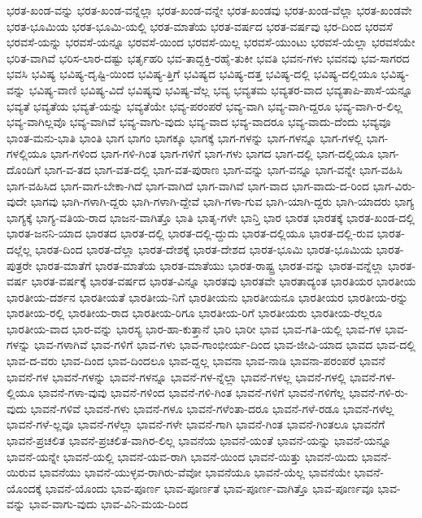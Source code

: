 {ಭರತ-ಖಂಡ-ವನ್ನು
ಭರತ-ಖಂಡ-ವನ್ನೆಲ್ಲಾ
ಭರತ-ಖಂಡ-ವನ್ನೇ
ಭರತ-ಖಂಡವು
ಭರತ-ಖಂಡ-ವೆಲ್ಲಾ
ಭರತ-ಖಂಡವೇ
ಭರತ-ಭೂಮಿಯ
ಭರತ-ಭೂಮಿ-ಯಲ್ಲಿ
ಭರತ-ಮಾತೆಯ
ಭರತ-ವರ್ಷದ
ಭರತ-ವರ್ಷವು
ಭರ-ದಿಂದ
ಭರವಸೆ
ಭರವಸೆ-ಯನ್ನು
ಭರವಸೆ-ಯನ್ನೂ
ಭರವಸೆ-ಯಿಂದ
ಭರವಸೆ-ಯಿಲ್ಲ
ಭರವಸೆ-ಯುಂಟು
ಭರವಸೆ-ಯೆಲ್ಲಾ
ಭರವಸೆಯೇ
ಭರಿತ-ವಾಗಿವೆ
ಭರಿಸ-ಲಾರ-ದಷ್ಟು
ಭರ್ತೃಹರಿ
ಭವ-ತಾದ್ಭಕ್ತಿ-ರಹೈ-ತುಕೀ
ಭವತಿ
ಭವನ-ಗಳು
ಭವನವು
ಭವ-ಸಾಗರದ
ಭವಸಿ
ಭವಿಷ್ಯ
ಭವಿಷ್ಯ-ದೃಷ್ಟಿ-ಯಿಂದ
ಭವಿಷ್ಯ-ತ್ತಿಗೆ
ಭವಿಷ್ಯದ
ಭವಿಷ್ಯ-ದತ್ತ
ಭವಿಷ್ಯ-ದಲ್ಲಿ
ಭವಿಷ್ಯ-ದಲ್ಲಿಯೂ
ಭವಿಷ್ಯ-ವನ್ನು
ಭವಿಷ್ಯ-ವಾಣಿ
ಭವಿಷ್ಯ-ವಿದೆ
ಭವಿಷ್ಯವು
ಭವಿಷ್ಯ-ವೆಲ್ಲ
ಭವ್ಯ
ಭವ್ಯತಮ
ಭವ್ಯತರ-ವಾದ
ಭವ್ಯತಾಪಿ-ಪಾಸೆ-ಯನ್ನೂ
ಭವ್ಯತೆ
ಭವ್ಯತೆಯ
ಭವ್ಯತೆ-ಯನ್ನು
ಭವ್ಯತೆಯೇ
ಭವ್ಯ-ಪರಂಪರೆ
ಭವ್ಯ-ವಾಗಿ
ಭವ್ಯ-ವಾಗಿ-ದ್ದರೂ
ಭವ್ಯ-ವಾಗಿ-ರ-ಲಿಲ್ಲ
ಭವ್ಯ-ವಾಗಿಲ್ಲವೊ
ಭವ್ಯ-ವಾಗಿವೆ
ಭವ್ಯ-ವಾಗು-ವುದು
ಭವ್ಯ-ವಾದ
ಭವ್ಯ-ವಾದರೂ
ಭವ್ಯ-ವಾದು-ದೆಂದು
ಭವ್ಯವೂ
ಭಾಂತ-ಮನು-ಭಾತಿ
ಭಾಂತಿ
ಭಾಗ
ಭಾಗಂ
ಭಾಗಕ್ಕೂ
ಭಾಗಕ್ಕೆ
ಭಾಗ-ಗಳನ್ನು
ಭಾಗ-ಗಳನ್ನೂ
ಭಾಗ-ಗಳಲ್ಲಿ
ಭಾಗ-ಗಳಲ್ಲಿಯೂ
ಭಾಗ-ಗಳಿಂದ
ಭಾಗ-ಗಳಿ-ಗಿಂತ
ಭಾಗ-ಗಳಿಗೆ
ಭಾಗ-ಗಳು
ಭಾಗದ
ಭಾಗ-ದಲ್ಲಿ
ಭಾಗ-ದಲ್ಲಿಯೂ
ಭಾಗ-ದೊಂದಿಗೆ
ಭಾಗ-ವ-ತದ
ಭಾಗ-ವತ-ದಲ್ಲಿ
ಭಾಗ-ವತ-ಪುರಾಣ
ಭಾಗ-ವನ್ನು
ಭಾಗ-ವನ್ನೂ
ಭಾಗ-ವನ್ನೇ
ಭಾಗ-ವಹಿಸಿ
ಭಾಗ-ವಹಿಸಿದ
ಭಾಗ-ವಾಗ-ಬೇಕಾ-ಗಿದೆ
ಭಾಗ-ವಾಗಿದೆ
ಭಾಗ-ವಾಗಿವೆ
ಭಾಗ-ವಾದ
ಭಾಗ-ವಾದು-ದ-ರಿಂದ
ಭಾಗ-ವಿರು-ವುದೇ
ಭಾಗವು
ಭಾಗಿ-ಗಳಾಗಿ-ದ್ದರು
ಭಾಗಿ-ಗಳಾಗಿ-ದ್ದೇವೆ
ಭಾಗಿ-ಗಳಾ-ಗುವ
ಭಾಗಿ-ಯಾಗಿ-ದ್ದರು
ಭಾಗಿ-ಯಾದರು
ಭಾಗ್ಯ
ಭಾಗ್ಯಕ್ಕೆ
ಭಾಗ್ಯ-ವತಿಯ-ರಾದ
ಭಾಜನ-ವಾಗಿತ್ತೊ
ಭಾತಿ
ಭಾತೃ-ಗಳೇ
ಭಾನ್ತಿ
ಭಾರ
ಭಾರತ
ಭಾರತಕ್ಕೆ
ಭಾರತ-ಖಂಡ-ದಲ್ಲಿ
ಭಾರತ-ಜನನಿ-ಯಾದ
ಭಾರತದ
ಭಾರತ-ದಲ್ಲಿ
ಭಾರತ-ದಲ್ಲಿ-ದ್ದುದು
ಭಾರತ-ದಲ್ಲಿಯೂ
ಭಾರತ-ದಲ್ಲಿ-ರುವ
ಭಾರತ-ದಲ್ಲೆಲ್ಲ
ಭಾರತ-ದಿಂದ
ಭಾರತ-ದೆಲ್ಲಾ
ಭಾರತ-ದೇಶಕ್ಕೆ
ಭಾರತ-ದೇಶದ
ಭಾರತ-ಭೂಮಿ
ಭಾರತ-ಭೂಮಿಯ
ಭಾರತ-ಪುತ್ರರೇ
ಭಾರತ-ಮಾತೆಗೆ
ಭಾರತ-ಮಾತೆಯ
ಭಾರತ-ಮಾತೆಯು
ಭಾರತ-ರಾಷ್ಟ್ರ
ಭಾರತ-ವನ್ನು
ಭಾರತ-ವನ್ನೆಲ್ಲಾ
ಭಾರತ-ವರ್ಷ
ಭಾರತ-ವರ್ಷಕ್ಕೆ
ಭಾರತ-ವರ್ಷದ
ಭಾರತ-ವಿನ್ನೂ
ಭಾರತವು
ಭಾರತವೇ
ಭಾರತಾದ್ಯಂತ
ಭಾರತಿಯರ
ಭಾರತೀಯ
ಭಾರತೀಯ-ದರ್ಶನ
ಭಾರತೀಯತೆ
ಭಾರತೀಯ-ನಿಗೆ
ಭಾರತೀಯನು
ಭಾರತೀಯನೂ
ಭಾರತೀಯರ
ಭಾರತೀಯ-ರನ್ನು
ಭಾರತೀಯ-ರಲ್ಲಿ
ಭಾರತೀಯ-ರಾದ
ಭಾರತೀಯ-ರಿಗೂ
ಭಾರತೀಯ-ರಿಗೆ
ಭಾರತೀಯರು
ಭಾರತೀಯ-ರೆಲ್ಲರೂ
ಭಾರತೀಯ-ವಾದ
ಭಾರ-ವನ್ನು
ಭಾರಸ್ಯ
ಭಾರ-ಹಾ-ಕುತ್ತಾನೆ
ಭಾರಿ
ಭಾರೀ
ಭಾವ
ಭಾವ-ಗತಿ-ಯಲ್ಲಿ
ಭಾವ-ಗಳ
ಭಾವ-ಗಳನ್ನು
ಭಾವ-ಗಳಾಗಿವೆ
ಭಾವ-ಗಳಿಗೆ
ಭಾವ-ಗಳು
ಭಾವ-ಗಾಂಭೀರ್ಯ-ದಿಂದ
ಭಾವ-ಜೀವಿ-ಯಾದ
ಭಾವದ
ಭಾವ-ದಲ್ಲಿ
ಭಾವ-ದ-ವರು
ಭಾವ-ದಿಂದ
ಭಾವ-ದಿಂದಲೂ
ಭಾವ-ದ್ದಲ್ಲ
ಭಾವನಾ
ಭಾವ-ನಾಡಿ
ಭಾವನಾ-ಪರಂಪರೆ
ಭಾವನೆ
ಭಾವನೆ-ಗಳ
ಭಾವನೆ-ಗಳನ್ನು
ಭಾವನೆ-ಗಳನ್ನೂ
ಭಾವನೆ-ಗಳ-ನ್ನೆಲ್ಲಾ
ಭಾವನೆ-ಗಳಲ್ಲ
ಭಾವನೆ-ಗಳಲ್ಲಿ
ಭಾವನೆ-ಗಳ-ಲ್ಲಿಯೂ
ಭಾವನೆ-ಗಳಾ-ವುವು
ಭಾವನೆ-ಗಳಿಂದ
ಭಾವನೆ-ಗಳಿ-ಗಿಂತ
ಭಾವನೆ-ಗಳಿಗೆ
ಭಾವನೆ-ಗಳಿಗೆಲ್ಲ
ಭಾವನೆ-ಗಳಿ-ರು-ವುದು
ಭಾವನೆ-ಗಳಿವೆ
ಭಾವನೆ-ಗಳು
ಭಾವನೆ-ಗಳೂ
ಭಾವನೆ-ಗಳೆಂತಾ-ದರೂ
ಭಾವನೆ-ಗಳೆ-ರಡೂ
ಭಾವನೆ-ಗಳೆಲ್ಲ
ಭಾವನೆ-ಗಳೆ-ಲ್ಲವೂ
ಭಾವನೆ-ಗಳೆಲ್ಲಾ
ಭಾವನೆ-ಗಳೇ
ಭಾವನೆ-ಗಾಗಿ
ಭಾವನೆ-ಗಿಂತ
ಭಾವನೆ-ಗಿಂತಲೂ
ಭಾವನೆಗೆ
ಭಾವನೆ-ಪ್ರಚಲಿತ
ಭಾವನೆ-ಪ್ರಚಲಿತ-ವಾಗಿರ-ಲಿಲ್ಲ
ಭಾವನೆಯ
ಭಾವನೆ-ಯಂತೆ
ಭಾವನೆ-ಯನ್ನು
ಭಾವನೆ-ಯನ್ನೂ
ಭಾವನೆ-ಯನ್ನೇ
ಭಾವನೆ-ಯಲ್ಲಿ
ಭಾವನೆ-ಯವ-ರಾಗಿ
ಭಾವನೆ-ಯಿಂದ
ಭಾವನೆ-ಯಿತ್ತು
ಭಾವನೆ-ಯಿದು
ಭಾವನೆ-ಯಿರುವ
ಭಾವನೆಯು
ಭಾವನೆ-ಯುಳ್ಳವ-ರಾಗಿರು-ವೆವೋ
ಭಾವನೆಯೂ
ಭಾವನೆ-ಯೆಲ್ಲ
ಭಾವನೆಯೇ
ಭಾವನೆ-ಯೊಂದಕ್ಕೆ
ಭಾವನೆ-ಯೊಂದು
ಭಾವ-ಪೂರ್ಣ
ಭಾವ-ಪೂರ್ಣತೆ
ಭಾವ-ಪೂರ್ಣ-ವಾಗಿತ್ತೊ
ಭಾವ-ಪೂರ್ಣವೂ
ಭಾವ-ವನ್ನು
ಭಾವ-ವಾಗು-ವುದು
ಭಾವ-ವಿನಿ-ಮಯ-ದಿಂದ
}

